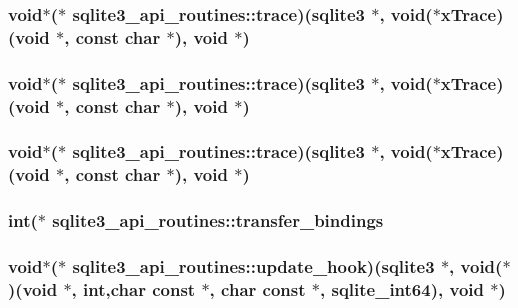 \subsubsection{\setlength{\rightskip}{0pt plus 5cm}void$\ast$($\ast$ \bf{sqlite3\_\-api\_\-routines::trace})(\bf{sqlite3} $\ast$, void($\ast$x\-Trace)(void $\ast$, const char $\ast$), void $\ast$)}\label{structsqlite3__api__routines_7e5ca6899320fb90ee743c49a9236172}


\subsubsection{\setlength{\rightskip}{0pt plus 5cm}void$\ast$($\ast$ \bf{sqlite3\_\-api\_\-routines::trace})(\bf{sqlite3} $\ast$, void($\ast$x\-Trace)(void $\ast$, const char $\ast$), void $\ast$)}\label{structsqlite3__api__routines_7e5ca6899320fb90ee743c49a9236172}


\subsubsection{\setlength{\rightskip}{0pt plus 5cm}void$\ast$($\ast$ \bf{sqlite3\_\-api\_\-routines::trace})(\bf{sqlite3} $\ast$, void($\ast$x\-Trace)(void $\ast$, const char $\ast$), void $\ast$)}\label{structsqlite3__api__routines_7e5ca6899320fb90ee743c49a9236172}


\subsubsection{\setlength{\rightskip}{0pt plus 5cm}int($\ast$ \bf{sqlite3\_\-api\_\-routines::transfer\_\-bindings}}\label{structsqlite3__api__routines_76fd14eb092080f838e88bcaaa1ce332}


\subsubsection{\setlength{\rightskip}{0pt plus 5cm}void$\ast$($\ast$ \bf{sqlite3\_\-api\_\-routines::update\_\-hook})(\bf{sqlite3} $\ast$, void($\ast$)(void $\ast$, int,char const $\ast$, char const $\ast$, \bf{sqlite\_\-int64}), void $\ast$)}\label{structsqlite3__api__routines_f43e600ad749ada9e85b9dab1ec33410}


